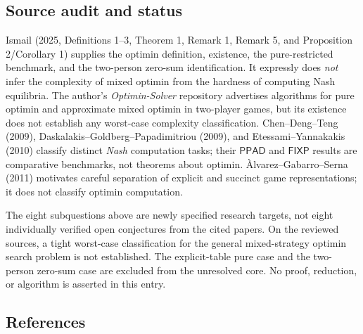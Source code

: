 \documentclass[11pt,a4paper]{article}
\begin{document}
\subsection*{Source audit and status}

Ismail (2025, Definitions 1--3, Theorem 1, Remark 1, Remark 5, and Proposition 2/Corollary 1) supplies the optimin definition, existence, the pure-restricted benchmark, and the two-person zero-sum identification. It expressly does \emph{not} infer the complexity of mixed optimin from the hardness of computing Nash equilibria. The author's \emph{Optimin-Solver} repository advertises algorithms for pure optimin and approximate mixed optimin in two-player games, but its existence does not establish any worst-case complexity classification. Chen--Deng--Teng (2009), Daskalakis--Goldberg--Papadimitriou (2009), and Etessami--Yannakakis (2010) classify distinct \emph{Nash} computation tasks; their $\mathsf{PPAD}$ and $\mathsf{FIXP}$ results are comparative benchmarks, not theorems about optimin. \`Alvarez--Gabarro--Serna (2011) motivates careful separation of explicit and succinct game representations; it does not classify optimin computation.

The eight subquestions above are newly specified research targets, not eight individually verified open conjectures from the cited papers. On the reviewed sources, a tight worst-case classification for the general mixed-strategy optimin search problem is not established. The explicit-table pure case and the two-person zero-sum case are excluded from the unresolved core. No proof, reduction, or algorithm is asserted in this entry.

\subsection*{References}
\end{document}
